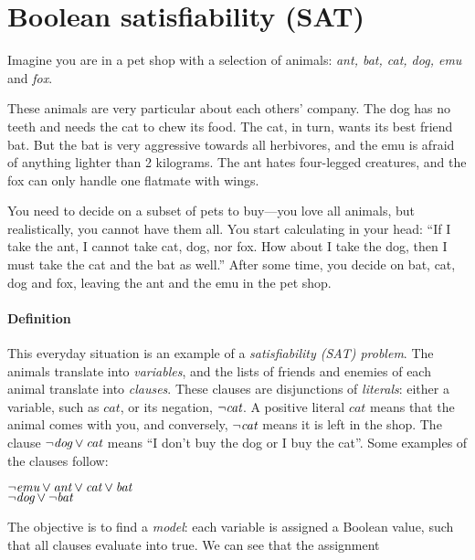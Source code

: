 \def\ant{\text{\em ant}}
\def\bat{\text{\em bat}}
\def\cat{\text{\em cat}}
\def\dog{\text{\em dog}}
\def\emu{\text{\em emu}}
\def\fox{\text{\em fox}}


\section{Boolean satisfiability (SAT)}


Imagine you are in a pet shop with a selection of animals: {\em ant, bat, cat, dog, emu} and {\em fox}.

These animals are very particular about each others' company. The dog has no teeth and needs the cat to chew its food. The cat, in turn, wants its best friend bat. 
But the bat is very aggressive towards all herbivores, and the emu is afraid of anything lighter than 2 kilograms. The ant hates four-legged creatures, and the fox can only handle one flatmate with wings. 

You need to decide on a subset of pets to buy---you love all animals, but realistically, you cannot have them all. You start calculating in your head: ``If I take the ant, I cannot take cat, dog, nor fox. How about I take the dog, then I must take the cat and the bat as well.''
After some time, you decide on bat, cat, dog and fox, leaving the ant and the emu in the pet shop.

\paragraph{Definition}

This everyday situation is an example of a \emph{satisfiability (SAT) problem}.
The animals translate into \emph{variables}, %
and the lists of friends and enemies of each animal translate into \emph{clauses}.
These clauses are disjunctions of \emph{literals}: either a variable, such as $cat$, or its negation, $\neg{}\cat$.
A positive literal $cat$ means that the animal comes with you, 
and conversely, $\neg{}\cat$ means it is left in the shop. 
The clause $\neg{}\dog \vee \cat$ means ``I don't buy the dog or I buy the cat''. 
Some examples of the clauses follow:

\begin{center}
$\neg{}\emu \vee \ant \vee \cat \vee \bat$ \\
$\neg{}\dog \vee \neg{}\bat$ \\
\end{center}

The objective is to find a \emph{model}: each variable is assigned a Boolean value, such that all clauses evaluate into true. We can see that the assignment 

